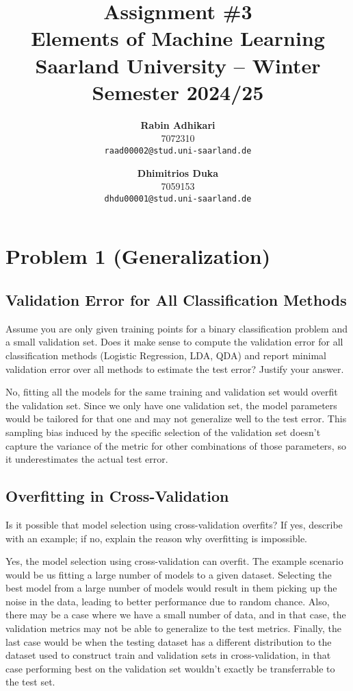 \documentclass{article}
\title{Assignment \#3\\
  \vspace{2mm}
  \small{Elements of Machine Learning}
  \\
  \vspace{2mm}
  \small{Saarland University -- Winter Semester 2024/25}
}
\author{%
\textbf{Rabin Adhikari} \\
  7072310 \\
  \texttt{raad00002@stud.uni-saarland.de} \\
  \and
  \textbf{Dhimitrios Duka} \\
 7059153 \\
  \texttt{dhdu00001@stud.uni-saarland.de} \\
}
\begin{document}
\maketitle

\section{Problem 1 (Generalization)}
\subsection{Validation Error for All Classification Methods}

\question
Assume you are only given training points for a binary classification problem and a small validation set.
Does it make sense to compute the validation error for all classification methods (Logistic Regression, LDA, QDA) and report minimal validation error over all methods to estimate the test error?
Justify your answer.

\answer
No, fitting all the models for the same training and validation set would overfit the validation set.
Since we only have one validation set, the model parameters would be tailored for that one and may not generalize well to the test error.
This sampling bias induced by the specific selection of the validation set doesn't capture the variance of the metric for other combinations of those parameters, so it underestimates the actual test error.

\subsection{Overfitting in Cross-Validation}

\question   
Is it possible that model selection using cross-validation overfits?
If yes, describe with an example; if no, explain the reason why overfitting is impossible.

\answer
Yes, the model selection using cross-validation can overfit.
The example scenario would be us fitting a large number of models to a given dataset.
Selecting the best model from a large number of models would result in them picking up the noise in the data, leading to better performance due to random chance.
Also, there may be a case where we have a small number of data, and in that case, the validation metrics may not be able to generalize to the test metrics.
Finally, the last case would be when the testing dataset has a different distribution to the dataset used to construct train and validation sets in cross-validation, in that case performing best on the validation set wouldn't exactly be transferrable to the test set.
\end{document}
